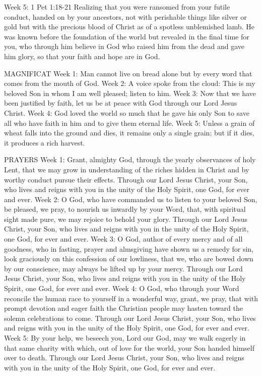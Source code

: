 Week 5:    1 Pet 1:18-21    Realizing that you were ransomed from your futile conduct, handed on by your ancestors, not with perishable things like silver or gold but with the precious blood of Christ as of a spotless unblemished lamb. He was known before the foundation of the world but revealed in the final time for you, who through him believe in God who raised him from the dead and gave him glory, so that your faith and hope are in God. 

MAGNIFICAT
Week 1:	Man cannot live on bread alone but by every word that comes from the mouth of God.
Week 2:	A voice spoke from the cloud: This is my beloved Son in whom I am well pleased; listen to him.
Week 3:	Now that we have been justified by faith, let us be at peace with God through our Lord Jesus Christ.
Week 4:	God loved the world so much that he gave his only Son to save all who have faith in him and to give them eternal life.
Week 5:	Unless a grain of wheat falls into the ground and dies, it remains only a single grain; but if it dies, it produces a rich harvest.

PRAYERS
Week 1:	Grant, almighty God, through the yearly observances of holy Lent, that we may grow in understanding of the riches hidden in Christ and by worthy conduct pursue their effects. Through our Lord Jesus Christ, your Son, who lives and reigns with you in the unity of the Holy Spirit, one God, for ever and ever.
Week 2:	O God, who have commanded us to listen to your beloved Son, be pleased, we pray, to nourish us inwardly by your Word, that, with spiritual sight made pure, we may rejoice to behold your glory. Through our Lord Jesus Christ, your Son, who lives and reigns with you in the unity of the Holy Spirit, one God, for ever and ever.
Week 3:	O God, author of every mercy and of all goodness, who in fasting, prayer and almsgiving have shown us a remedy for sin, look graciously on this confession of our lowliness, that we, who are bowed down by our conscience, may always be lifted up by your mercy. Through our Lord Jesus Christ, your Son, who lives and reigns with you in the unity of the Holy Spirit, one God, for ever and ever.
Week 4:	O God, who through your Word reconcile the human race to yourself in a wonderful way, grant, we pray, that with prompt devotion and eager faith the Christian people may hasten toward the solemn celebrations to come. Through our Lord Jesus Christ, your Son, who lives and reigns with you in the unity of the Holy Spirit, one God, for ever and ever.
Week 5:	By your help, we beseech you, Lord our God, may we walk eagerly in that same charity with which, out of love for the world, your Son handed himself over to death. Through our Lord Jesus Christ, your Son, who lives and reigns with you in the unity of the Holy Spirit, one God, for ever and ever.

